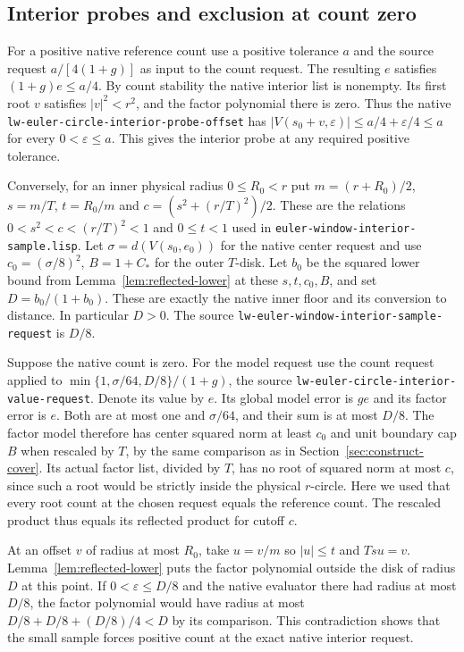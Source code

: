 \documentclass[11pt]{amsart}
\theoremstyle{definition}
\theoremstyle{remark}
\numberwithin{equation}{section}
\newcommand{\code}[1]{\nolinkurl{#1}}
\begin{document}
\subsection{Interior probes and exclusion at count zero}

For a positive native reference count use a positive
tolerance $a$ and the source request $a/[4(1+g)]$
as input to the count request. The resulting $e$ satisfies
$(1+g)e\le a/4$. By count stability the native interior
list is nonempty. Its first root $v$ satisfies $|v|^2<r^2$,
and the factor polynomial there is zero. Thus the
native \code{lw-euler-circle-interior-probe-offset}
has $|V(s_0+v,\varepsilon)|\le a/4+\varepsilon/4\le a$
for every $0<\varepsilon\le a$. This gives the interior
probe at any required positive tolerance.

Conversely, for an inner physical radius $0\le R_0<r$
put $m=(r+R_0)/2$, $s=m/T$, $t=R_0/m$ and
$c=(s^2+(r/T)^2)/2$. These are the relations
$0<s^2<c<(r/T)^2<1$ and $0\le t<1$ used in
\code{euler-window-interior-sample.lisp}.
Let $\sigma=d(V(s_0,e_0))$ for the native center
request and use $c_0=(\sigma/8)^2$, $B=1+C_*$
for the outer $T$-disk. Let $b_0$ be the squared lower
bound from Lemma~\ref{lem:reflected-lower} at
these $s,t,c_0,B$, and set $D=b_0/(1+b_0)$.
These are exactly the native inner floor and its
conversion to distance. In particular $D>0$.
The source \code{lw-euler-window-interior-sample-request}
is $D/8$.

Suppose the native count is zero. For the model request use
the count request applied to
$\min\{1,\sigma/64,D/8\}/(1+g)$, the source
\code{lw-euler-circle-interior-value-request}. Denote its
value by $e$. Its global model error is $ge$ and its factor
error is $e$. Both are at most one and $\sigma/64$, and
their sum is at most $D/8$. The factor model therefore
has center squared norm at least $c_0$ and unit boundary
cap $B$ when rescaled by $T$, by the same comparison as
in Section~\ref{sec:construct-cover}. Its actual factor
list, divided by $T$, has no root of squared norm at
most $c$, since such a root would be strictly inside
the physical $r$-circle. Here we used that every root
count at the chosen request equals the reference
count. The rescaled product thus equals its reflected
product for cutoff $c$.

At an offset $v$ of radius at most $R_0$, take $u=v/m$
so $|u|\le t$ and $Tsu=v$. Lemma~\ref{lem:reflected-lower}
puts the factor polynomial outside the disk of radius
$D$ at this point. If $0<\varepsilon\le D/8$ and the
native evaluator there had radius at most $D/8$, the
factor polynomial would have radius at most
$D/8+D/8+(D/8)/4<D$ by its comparison. This contradiction
shows that the small sample forces positive count at
the exact native interior request.
\end{document}
